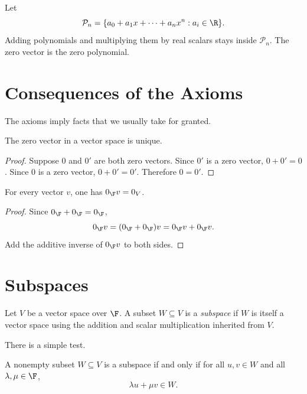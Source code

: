 \begin{example}
Let
\[
  \mathcal P_n
  =
  \{a_0+a_1x+\cdots+a_nx^n : a_i\in\R\}.
\]
Adding polynomials and multiplying them by real scalars stays inside
$\mathcal P_n$. The zero vector is the zero polynomial.
\end{example}

\section{Consequences of the Axioms}

The axioms imply facts that we usually take for granted.

\begin{proposition}
  The zero vector in a vector space is unique.
\end{proposition}

\begin{proof}
  Suppose $0$ and $0'$ are both zero vectors. Since $0'$ is a zero vector,
  $0+0'=0$. Since $0$ is a zero vector, $0+0'=0'$. Therefore $0=0'$.
\end{proof}

\begin{proposition}
  For every vector $v$, one has $0_{\F}v=0_V$.
\end{proposition}

\begin{proof}
  Since $0_{\F}+0_{\F}=0_{\F}$,
  \[
    0_{\F}v=(0_{\F}+0_{\F})v=0_{\F}v+0_{\F}v.
  \]
  Add the additive inverse of $0_{\F}v$ to both sides.
\end{proof}

\section{Subspaces}

\begin{definition}
  Let $V$ be a vector space over $\F$. A subset $W\subseteq V$ is a
  \emph{subspace} if $W$ is itself a vector space using the addition and scalar
  multiplication inherited from $V$.
\end{definition}

There is a simple test.

\begin{theorem}
  A nonempty subset $W\subseteq V$ is a subspace if and only if for all
  $u,v\in W$ and all $\lambda,\mu\in\F$,
  \[
    \lambda u+\mu v\in W.
  \]
\end{theorem}


